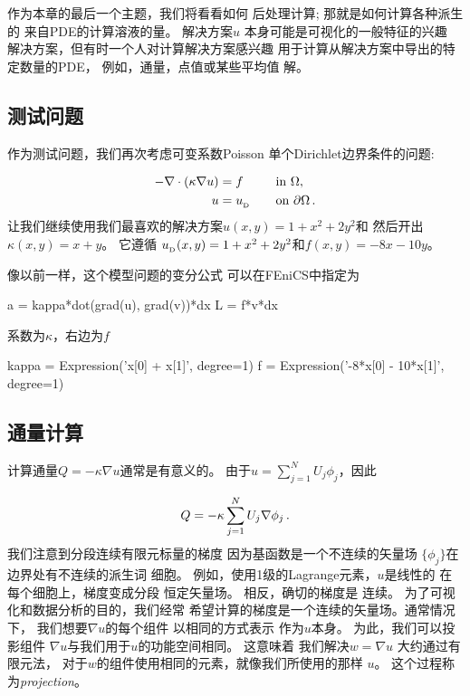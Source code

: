 
作为本章的最后一个主题，我们将看看如何
后处理计算; 那就是如何计算各种派生的
来自PDE的计算溶液的量。 解决方案$u$
本身可能是可视化的一般特征的兴趣
解决方案，但有时一个人对计算解决方案感兴趣
用于计算从解决方案中导出的特定数量的PDE，
例如，通量，点值或某些平均值
解。

\subsection{测试问题}

作为测试问题，我们再次考虑可变系数Poisson
单个Dirichlet边界条件的问题:

\begin{alignat}{2}
    - \nabla\cdot(\kappa\nabla u) &= f \quad &&\mbox{in } \Omega,
\label{ch:poisson0:2D:varcoeff} \\
    u &= u_{_\mathrm{D}} \quad &&\mbox{on}\  \partial\Omega\thinspace .
\end{alignat}
让我们继续使用我们最喜欢的解决方案$u(x,y)=1+x^2+2y^2$和
然后开出$\kappa(x,y)=x+y$。 它遵循
$u_{_\mathrm{D}}(x,y)=1+x^2+2y^2$和$f(x,y)=-8x-10y$。

像以前一样，这个模型问题的变分公式
可以在FEniCS中指定为

\begin{python}
a = kappa*dot(grad(u), grad(v))*dx
L = f*v*dx
\end{python}
系数为$\kappa$，右边为$f$

\begin{python}
kappa = Expression('x[0] + x[1]', degree=1)
f = Expression('-8*x[0] - 10*x[1]', degree=1)
\end{python}

\subsection{通量计算}
\label{ch:poisson0:gradu}

计算通量$Q=-\kappa\nabla u$通常是有意义的。
由于$u=\sum_{j=1}^N U_j \phi_j$，因此

\begin{equation*}
Q = -\kappa\sum_{j=1}^N U_j \nabla \phi_j\thinspace .
\end{equation*}
我们注意到分段连续有限元标量的梯度
因为基函数是一个不连续的矢量场
$\{\phi_j\}$在边界处有不连续的派生词
细胞。 例如，使用1级的Lagrange元素，$u$是线性的
在每个细胞上，梯度变成分段
恒定矢量场。 相反，确切的梯度是
连续。 为了可视化和数据分析的目的，我们经常
希望计算的梯度是一个连续的矢量场。通常情况下，
我们想要$\nabla u$的每个组件
以相同的方式表示
作为$u$本身。 为此，我们可以投影组件
$\nabla u$与我们用于$u$的功能空间相同。 这意味着
我们解决$w=\nabla u$
大约通过有限元法，
对于$w$的组件使用相同的元素，就像我们所使用的那样
$u$。 这个过程称为\emph{projection}。

